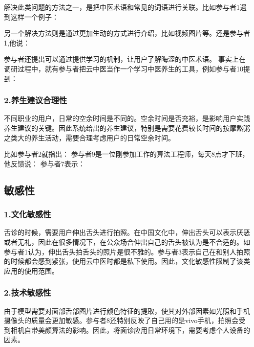 解决此类问题的方法之一，是把中医术语和常见的词语进行关联。比如参与者1遇到这样一个例子：

另一个解决方法则是通过更加生动的方式进行介绍，比如视频图片等。还是参与者1,他说：

参与者还提出可以通过提供学习的机制，让用户了解晦涩的中医术语。
事实上在调研过程中，就有参与者把云中医当作一个学习中医养生的工具，例如参与者10提到：

\subsubsection{2.养生建议合理性}

不同职业的用户，日常的空余时间是不同的。空余时间是否充裕，是影响用户实践养生建议的关键。因此系统给出的养生建议，特别是需要花费较长时间的按摩熬粥之类大的养生活动，需要合理考虑用户的日常空余时间。

比如参与者2就指出：
参与者9是一位刚参加工作的算法工程师，每天8点才下班，他反馈说： 参与者7表示：

\subsection{敏感性}
\subsubsection{1.文化敏感性}

舌诊的时候，需要用户伸出舌头进行拍照。在中国文化中，伸出舌头可以表示厌恶或者无礼，因此在很多情况下，在公众场合伸出自己的舌头被认为是不合适的。如参与者1认为，伸出舌头拍舌头的照片是很不雅的。参与者3表示自己在和别人拍照的时候都会感到紧张，使用云中医时都是私下使用。因此，文化敏感性限制了该类应用的使用范围。

\subsubsection{2.技术敏感性}

由于模型需要对面部舌部图片进行颜色特征的提取，使其对外部因素如光照和手机摄像头的质量会更加敏感。参与者8还特别反映了自己用的是vivo手机，拍照会受到相机自带美颜算法的影响。因此，将面诊应用日常环境下，需要考虑个人设备的因素。

